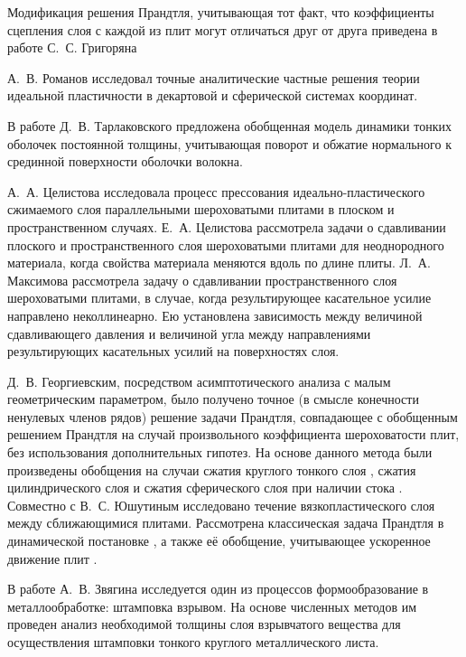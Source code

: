 Модификация решения Прандтля, учитывающая тот факт, что коэффициенты сцепления слоя с каждой из плит могут отличаться друг от друга приведена в работе С.~С. Григоряна \autocite{Grigoryan:1981} 

А.~В. Романов \autocite{Romanov:1982,Romanov:1984} исследовал точные аналитические частные решения теории идеальной пластичности в декартовой и сферической системах координат.

В работе Д.~В. Тарлаковского \autocite{Tarlakovskiy:2018} предложена обобщенная модель динамики тонких оболочек постоянной толщины, учитывающая поворот и обжатие нормального к срединной поверхности оболочки волокна.

А.~А. Целистова \autocite{Tselistova:1999} исследовала процесс прессования идеально-пластического сжимаемого слоя параллельными шероховатыми плитами в плоском и пространственном случаях.
Е.~А. Целистова \autocite{Tselistova:2000} рассмотрела задачи о сдавливании плоского и пространственного слоя шероховатыми плитами для неоднородного материала, когда свойства материала меняются вдоль по длине плиты.
Л.~А. Максимова \autocite{Maximova:1999} рассмотрела задачу о сдавливании пространственного слоя шероховатыми плитами, в случае, когда результирующее касательное усилие направлено неколлинеарно. Ею установлена зависимость между величиной сдавливающего давления и величиной угла между направлениями результирующих касательных усилий на поверхностях слоя.

Д.~В. Георгиевским, посредством асимптотического анализа с малым геометрическим параметром, было получено точное (в смысле конечности ненулевых членов рядов) решение \autocite{Georgievsky:2009} задачи Прандтля, совпадающее с обобщенным решением Прандтля на случай произвольного коэффициента шероховатости плит, без использования дополнительных гипотез. На основе данного метода были произведены обобщения на случаи сжатия круглого тонкого слоя \autocite{Georgievsky:2008}, сжатия цилиндрического слоя \autocite{Georgievsky:2010} и сжатия сферического слоя при наличии стока \autocite{Georgievsky:2011}. Совместно с В.~С. Юшутиным \autocite{Georgievsky:2012} исследовано течение вязкопластического слоя между сближающимися плитами. Рассмотрена классическая задача Прандтля в динамической постановке \autocite{Georgievsky:2013}, а также её обобщение, учитывающее ускоренное движение плит \autocite{Georgievsky:2019}.

В работе А.~В. Звягина \autocite{Zvyagin:1990} исследуется один из процессов формообразование в металлообработке: штамповка взрывом. На основе численных методов им проведен анализ необходимой толщины слоя взрывчатого вещества для осуществления штамповки тонкого круглого металлического листа.

